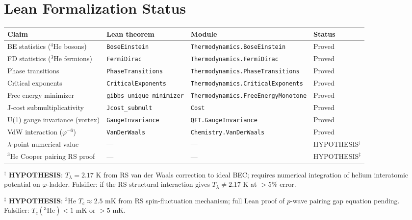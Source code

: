 \documentclass[12pt,a4paper]{article}
\theoremstyle{definition}
\theoremstyle{remark}
\begin{document}
\section{Lean Formalization Status}
\label{sec:lean}

\begin{center}
\begin{tabular}{llll}
\toprule
Claim & Lean theorem & Module & Status \\
\midrule
BE statistics ($^4$He bosons) & \texttt{BoseEinstein} & \texttt{Thermodynamics.BoseEinstein} & Proved \\
FD statistics ($^3$He fermions) & \texttt{FermiDirac} & \texttt{Thermodynamics.FermiDirac} & Proved \\
Phase transitions & \texttt{PhaseTransitions} & \texttt{Thermodynamics.PhaseTransitions} & Proved \\
Critical exponents & \texttt{CriticalExponents} & \texttt{Thermodynamics.CriticalExponents} & Proved \\
Free energy minimizer & \texttt{gibbs\_unique\_minimizer} & \texttt{Thermodynamics.FreeEnergyMonotone} & Proved \\
J-cost submultiplicativity & \texttt{Jcost\_submult} & \texttt{Cost} & Proved \\
U(1) gauge invariance (vortex) & \texttt{GaugeInvariance} & \texttt{QFT.GaugeInvariance} & Proved \\
VdW interaction ($\varphi^{-6}$) & \texttt{VanDerWaals} & \texttt{Chemistry.VanDerWaals} & Proved \\
\midrule
$\lambda$-point numerical value & --- & --- & HYPOTHESIS$^\dagger$ \\
$^3$He Cooper pairing RS proof & --- & --- & HYPOTHESIS$^\ddagger$ \\
\bottomrule
\end{tabular}
\end{center}

$^\dagger$ \textbf{HYPOTHESIS}: $T_\lambda = 2.17$ K from RS van der Waals
correction to ideal BEC; requires numerical integration of helium
interatomic potential on $\varphi$-ladder.  Falsifier: if the RS
structural interaction gives $T_\lambda \neq 2.17$ K at $> 5\%$ error.

$^\ddagger$ \textbf{HYPOTHESIS}: $^3$He $T_c \approx 2.5$ mK from
RS spin-fluctuation mechanism; full Lean proof of $p$-wave pairing
gap equation pending.  Falsifier: $T_c(^3\mathrm{He}) < 1$ mK or
$> 5$ mK.
\end{document}
